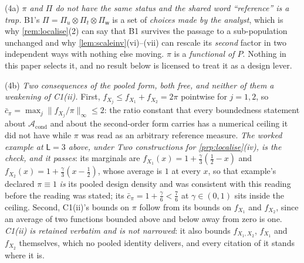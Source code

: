 \begin{remark}
\begin{enumerate}
\textup{(4a)} \emph{$\pi$ and $\Pi$ do not have the same status and the shared word ``reference'' is a
trap.} B1's $\Pi=\Pi_u\otimes\Pi_t\otimes\Pi_{\mathsf w}$ is a set of \emph{choices made by the
analyst}, which is why \cref{rem:localise}\textup{(2)} can say that B1 survives the passage to a
sub-population unchanged and why \cref{lem:scaleinv}\textup{(vi)}--\textup{(vii)} can rescale its
\emph{second} factor in two independent ways with nothing else moving. $\pi$ is a \emph{functional of
$P$}. Nothing in this paper selects it, and no result below is licensed to treat it as a design lever.

\textup{(4b)} \emph{Two consequences of the pooled form, both free, and neither of them a weakening of
C1(ii).} First, $f_{X_j}\le f_{X_1}+f_{X_2}=2\pi$ pointwise for $j=1,2$, so
$\bar c_\pi=\max_j\|f_{X_j}/\pi\|_\infty\le2$: the ratio constant that every boundedness statement about
$\mathcal A_{\mathrm{cond}}$ and about the second-order form carries has a numerical ceiling it did not
have while $\pi$ was read as an arbitrary reference measure. \emph{The worked example at $\mathsf L=3$
above, under \emph{Two constructions for \cref{prp:localise}\textup{(iv)}}, is the check, and it
passes}: its marginals are
$f_{X_1}(x)=1+\tfrac{\gamma}{3}(\tfrac12-x)$ and $f_{X_2}(x)=1+\tfrac{\gamma}{3}(x-\tfrac12)$, whose
average is $1$ at every $x$, so that example's declared $\pi\equiv1$ \emph{is} its pooled design
density and was consistent with this reading before the reading was stated; its
$\bar c_\pi=1+\tfrac{\gamma}{6}<\tfrac76$ at $\gamma\in(0,1)$ sits inside the ceiling.
Second, C1(ii)'s bounds on $\pi$ follow from its bounds on $f_{X_1}$ and $f_{X_2}$,
since an average of two functions bounded above and below away from zero is one. \emph{C1(ii) is
retained verbatim and is not narrowed}: it also bounds $f_{X_1,X_2}$, $f_{X_1}$ and $f_{X_2}$
themselves, which no pooled identity delivers, and every citation of it stands where it is.


\end{enumerate}
\end{remark}
